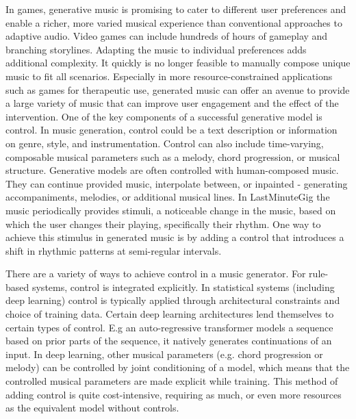 In games, generative music is promising to cater to different user preferences and enable a richer, more varied musical experience than conventional approaches to adaptive audio. Video games can include hundreds of hours of gameplay and branching storylines. Adapting the music to individual preferences adds additional complexity. It quickly is no longer feasible to manually compose unique music to fit all scenarios. Especially in more resource-constrained applications such as games for therapeutic use, generated music can offer an avenue to provide a large variety of music that can improve user engagement and the effect of the intervention.
One of the key components of a successful generative model is control. In music generation, control could be a text description or information on genre, style, and instrumentation. Control can also include time-varying, composable musical parameters such as a melody, chord progression, or musical structure. Generative models are often controlled with human-composed music. They can continue provided music, interpolate between, or inpainted -  generating accompaniments, melodies, or additional musical lines. In LastMinuteGig\cite{Chalkiadakis_2022} the music periodically provides stimuli, a noticeable change in the music, based on which the user changes their playing, specifically their rhythm. One way to achieve this stimulus in generated music is by adding a control that introduces a shift in rhythmic patterns at semi-regular intervals. 

There are a variety of ways to achieve control in a music generator. For rule-based systems, control is integrated explicitly. In statistical systems (including deep learning) control is typically applied through architectural constraints and choice of training data. Certain deep learning architectures lend themselves to certain types of control. E.g an auto-regressive transformer models a sequence based on prior parts of the sequence, it natively generates continuations of an input. In deep learning, other musical parameters (e.g. chord progression or melody) can be controlled by joint conditioning of a model, which means that the controlled musical parameters are made explicit while training. This method of adding control is quite cost-intensive, requiring as much, or even more resources as the equivalent model without controls. 

